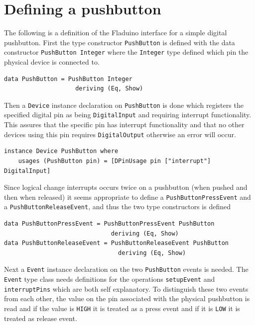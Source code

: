 \documentclass[a4paper, oneside, final]{memoir}
\begin{document}
\section{Defining a pushbutton}
\label{sec:pushbuttondef}
The following is a definition of the Fladuino interface for a simple digital
pushbutton. First the type constructor \texttt{PushButton} is defined with the
data constructor \texttt{PushButton Integer} where the \texttt{Integer} type
defined which pin the physical device is connected to.

\begin{verbatim}
data PushButton = PushButton Integer
                    deriving (Eq, Show)
\end{verbatim}

\noindent
Then a \texttt{Device} instance declaration on \texttt{PushButton} is done which
registers the specified digital pin as being \texttt{DigitalInput} and requiring
interrupt functionality. This assures that the specific pin has interrupt
functionality and that no other devices using this pin requires
\texttt{DigitalOutput} otherwise an error will occur.

\begin{verbatim}
instance Device PushButton where
    usages (PushButton pin) = [DPinUsage pin ["interrupt"] DigitalInput]
\end{verbatim}

Since logical change interrupts occurs twice on a pushbutton (when
pushed and then when released) it seems appropriate to define a
\texttt{PushButtonPressEvent} and a \texttt{PushButtonReleaseEvent},
and thus the two type constructors is defined

\begin{verbatim}
data PushButtonPressEvent = PushButtonPressEvent PushButton
                              deriving (Eq, Show)
data PushButtonReleaseEvent = PushButtonReleaseEvent PushButton
                                deriving (Eq, Show)
\end{verbatim}

\noindent
Next a \texttt{Event} instance declaration on the two \texttt{PushButton} events
is needed. The \texttt{Event} type class needs definitions for the operations
\texttt{setupEvent} and \texttt{interruptPins} which are both self
explanatory. To distinguish these two events from each other, the value on the
pin associated with the physical pushbutton is read and if the value is
\texttt{HIGH} it is treated as a press event and if it is \texttt{LOW} it is
treated as release event.
\end{document}
